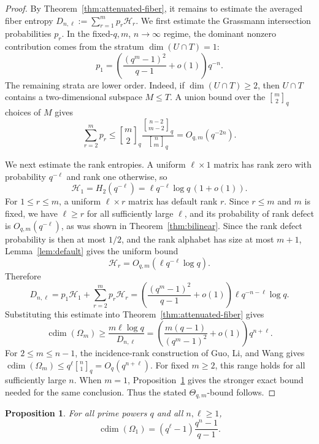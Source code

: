 \documentclass[11pt]{article}
\newtheorem{proposition}[theorem]{Proposition}
\theoremstyle{definition}
\theoremstyle{remark}
\newcommand{\cdim}{\operatorname{cdim}}
\newcommand{\qbinom}[2]{\genfrac{[}{]}{0pt}{}{#1}{#2}_q}
\begin{document}
\begin{proof}
By Theorem~\ref{thm:attenuated-fiber}, it remains to estimate the averaged
fiber entropy \(D_{n,\ell}:=\sum_{r=1}^m p_r\mathcal H_r\).
We first estimate the Grassmann intersection probabilities \(p_r\).  In 
the
fixed-\(q,m\), \(n\to\infty\) regime, the dominant nonzero contribution 
comes
from the stratum \(\dim(U\cap T)=1\):
\[
        p_1=
        \left(\frac{(q^m-1)^2}{q-1}+o(1)\right)q^{-n}.
\]
The remaining strata are lower order.  Indeed, if \(\dim(U\cap T)\geq 2\), 
then
\(U\cap T\) contains a two-dimensional subspace \(M\leq T\).  A union 
bound over
the \(\qbinom m2\) choices of \(M\) gives
\[
        \sum_{r=2}^m p_r
        \leq
        \qbinom m2
        \frac{\qbinom{n-2}{m-2}}{\qbinom nm}
        =
        O_{q,m}(q^{-2n}).
\]

We next estimate the rank entropies.  A uniform \(\ell\times 1\) matrix 
has rank
zero with probability \(q^{-\ell}\) and rank one otherwise, so
\[
        \mathcal H_1
        =
        H_2(q^{-\ell})
        =
        \ell q^{-\ell}\log q\,(1+o(1)).
\]
For \(1\leq r\leq m\), a uniform \(\ell\times r\) matrix has default rank 
\(r\).  Since \(r\leq m\) and \(m\) is fixed, we have \(\ell\geq r\) for
all sufficiently large \(\ell\),
and its probability of rank defect is \(O_{q,m}(q^{-\ell})\), as was shown 
in Theorem~\ref{thm:bilinear}.  Since the rank
defect probability is then at most \(1/2\), and the rank alphabet has size
at most \(m+1\), Lemma~\ref{lem:default} gives the 
uniform
bound
\[
        \mathcal H_r
        =
        O_{q,m}(\ell q^{-\ell}\log q).
\]
Therefore
\[
        D_{n,\ell}
        =
        p_1\mathcal H_1
        +
        \sum_{r=2}^m p_r\mathcal H_r
        =
        \left(\frac{(q^m-1)^2}{q-1}+o(1)\right)
        \ell q^{-n-\ell}\log q.
\]
Substituting this estimate into Theorem~\ref{thm:attenuated-fiber} gives
\[
        \cdim(\Omega_m)
        \geq
        \frac{m\ell\log q}{D_{n,\ell}}
        =
        \left(\frac{m(q-1)}{(q^m-1)^2}+o(1)\right)q^{n+\ell}.
\]
For \(2\leq m\leq n-1\), the incidence-rank construction of Guo, Li, and
Wang gives
\(\cdim(\Omega_m)\leq q^\ell\qbinom n1=O_q(q^{n+\ell})\).  For fixed
\(m\geq2\), this range holds for all sufficiently large \(n\).  When
\(m=1\), Proposition~\ref{obs:rank-one} gives the stronger exact bound
needed for the same conclusion.  Thus the stated
\(\Theta_{q,m}\)-bound follows.
\end{proof}



\begin{proposition}\label{obs:rank-one}
For all prime powers \(q\) and all \(n,\ell\geq 1\),
\[
        \cdim(\Omega_1)
        =
        (q^\ell-1)\frac{q^n-1}{q-1}.
\]
\end{proposition}
\end{document}
